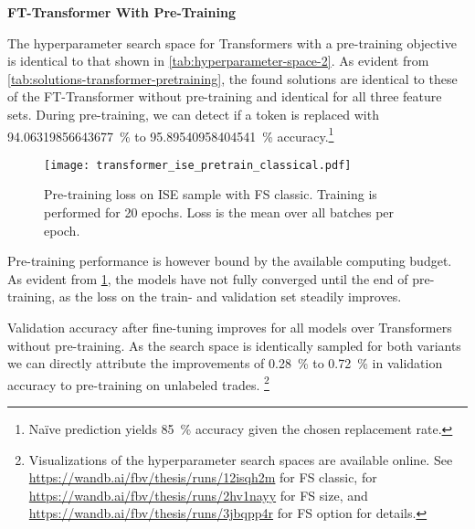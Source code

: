 \vskip 1.3in

\textbf{FT-Transformer With Pre-Training}

The hyperparameter search space for Transformers with a pre-training objective is identical to that shown in \cref{tab:hyperparameter-space-2}. As evident from \cref{tab:solutions-transformer-pretraining}, the found solutions are identical to these of the FT-Transformer without pre-training and identical for all three feature sets. During pre-training, we can detect if a token is replaced with \SI{94.06319856643677}{\percent} to \SI{95.89540958404541}{\percent} accuracy.\footnote{Na\"ive prediction yields \SI{85}{\percent} accuracy given the chosen replacement rate.}

\begin{figure}[!h]
    \centering
    \texttt{[image: transformer\_ise\_pretrain\_classical.pdf]}
    \caption[Pre-Training Loss of FT-Transformer]{Pre-training loss on \gls{ISE} sample with \gls{FS} classic. Training is performed for 20 epochs. Loss is the mean over all batches per epoch.}
    \label{fig:fttransformer-pretrain-loss}
\end{figure}

Pre-training performance is however bound by the available computing budget. As evident from \cref{fig:fttransformer-pretrain-loss}, the models have not fully converged until the end of pre-training, as the loss on the train- and validation set steadily improves.

Validation accuracy after fine-tuning improves for all models over Transformers without pre-training. As the search space is identically sampled for both variants we can directly attribute the improvements of \SI{0.28}{\percent} to \SI{0.72}{\percent} in validation accuracy to pre-training on unlabeled trades. \footnote{Visualizations of the hyperparameter search spaces are available online. See \url{https://wandb.ai/fbv/thesis/runs/12isqh2m} for \gls{FS} classic, for \url{https://wandb.ai/fbv/thesis/runs/2hv1nayy} for \gls{FS} size, and \url{https://wandb.ai/fbv/thesis/runs/3jbqpp4r} for \gls{FS} option for details.}


